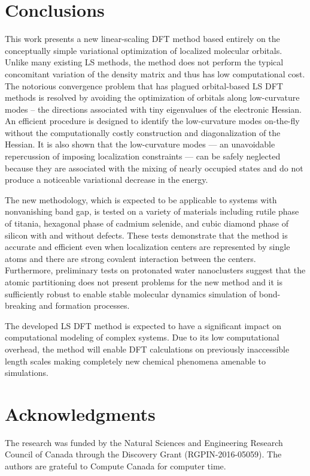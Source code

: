 \documentclass[10pt,amsmath,twocolumn,aps,prl,superscriptaddress,floatfix]{revtex4-1}
\begin{document}
\section{Conclusions} 

This work presents a new linear-scaling DFT method based entirely on the conceptually simple variational optimization of localized molecular orbitals. 
Unlike many existing LS methods, the method does not perform the typical concomitant variation of the density matrix and thus has low computational cost. 
The notorious convergence problem that has plagued orbital-based LS DFT methods is resolved by avoiding the optimization of orbitals along low-curvature modes -- the directions associated with tiny eigenvalues of the electronic Hessian. 
An efficient procedure is designed to identify the low-curvature modes on-the-fly without the computationally costly construction and diagonalization of the Hessian. 
It is also shown that the low-curvature modes --- an unavoidable repercussion of imposing localization constraints --- can be safely neglected because they are associated with the mixing of nearly occupied states and do not produce a noticeable variational decrease in the energy. 

The new methodology, which is expected to be applicable to systems with nonvanishing band gap, is tested on a variety of materials including rutile phase of titania, hexagonal phase of cadmium selenide, and cubic diamond phase of silicon with and without defects. 
These tests demonstrate that the method is accurate and efficient even when localization centers are represented by single atoms and there are strong covalent interaction between the centers. 
Furthermore, preliminary tests on protonated water nanoclusters suggest that the atomic partitioning does not present problems for the new method and it is sufficiently robust to enable stable molecular dynamics simulation of bond-breaking and formation processes. 

The developed LS DFT method is expected to have a significant impact on computational modeling of complex systems. Due to its low computational overhead, the method will enable DFT calculations on previously inaccessible length scales making completely new chemical phenomena amenable to simulations.

\section{Acknowledgments} The research was funded by the Natural Sciences and Engineering Research Council of Canada through the Discovery Grant (RGPIN-2016-05059). The authors are grateful to Compute Canada for computer time.
\end{document}
